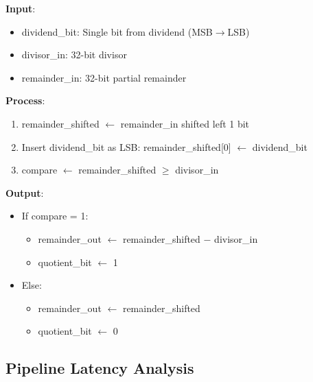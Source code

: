 \documentclass[a4paper, 11pt]{article}
\begin{document}
\begin{algorithm}[H]
\DontPrintSingleQuotedStrings
\DontPrintSemicolon

\textbf{Input}: 
\begin{itemize}
    \item dividend\_bit: Single bit from dividend (MSB$\rightarrow$LSB)
    \item divisor\_in: 32-bit divisor
    \item remainder\_in: 32-bit partial remainder
\end{itemize}

\textbf{Process}:
\begin{enumerate}
    \item remainder\_shifted $\leftarrow$ remainder\_in shifted left 1 bit
    \item Insert dividend\_bit as LSB: remainder\_shifted[0] $\leftarrow$ dividend\_bit
    \item compare $\leftarrow$ remainder\_shifted $\geq$ divisor\_in
\end{enumerate}

\textbf{Output}:
\begin{itemize}
    \item If compare = 1: 
    \begin{itemize}
        \item remainder\_out $\leftarrow$ remainder\_shifted $-$ divisor\_in
        \item quotient\_bit $\leftarrow$ 1
    \end{itemize}
    \item Else:
    \begin{itemize}
        \item remainder\_out $\leftarrow$ remainder\_shifted
        \item quotient\_bit $\leftarrow$ 0
    \end{itemize}
\end{itemize}

\caption{Single Iteration Division Step}
\end{algorithm}

\subsection{Pipeline Latency Analysis}
\end{document}

